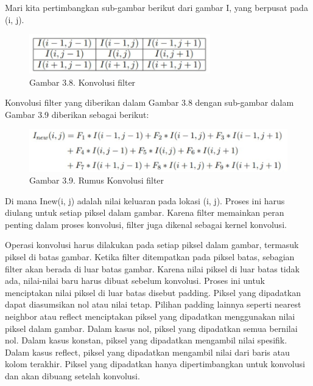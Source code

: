 \documentclass[
  letterpaper,
  DIV=11,
  numbers=noendperiod]{scrreprt}
\begin{document}
Mari kita pertimbangkan sub-gambar berikut dari gambar I, yang berpusat
pada (i, j).

\begin{figure}

{\centering \includegraphics[width=0.7\textwidth,height=\textheight]{Asset/image1117.png}

}

\caption{Gambar 3.8. Konvolusi filter}

\end{figure}

Konvolusi filter yang diberikan dalam Gambar 3.8 dengan sub-gambar dalam
Gambar 3.9 diberikan sebagai berikut:

\begin{figure}

{\centering \includegraphics{Asset/image1118.png}

}

\caption{Gambar 3.9. Rumus Konvolusi filter}

\end{figure}

Di mana Inew(i, j) adalah nilai keluaran pada lokasi (i, j). Proses ini
harus diulang untuk setiap piksel dalam gambar. Karena filter memainkan
peran penting dalam proses konvolusi, filter juga dikenal sebagai kernel
konvolusi.

Operasi konvolusi harus dilakukan pada setiap piksel dalam gambar,
termasuk piksel di batas gambar. Ketika filter ditempatkan pada piksel
batas, sebagian filter akan berada di luar batas gambar. Karena nilai
piksel di luar batas tidak ada, nilai-nilai baru harus dibuat sebelum
konvolusi. Proses ini untuk menciptakan nilai piksel di luar batas
disebut padding. Piksel yang dipadatkan dapat diasumsikan nol atau nilai
tetap. Pilihan padding lainnya seperti nearest neighbor atau reflect
menciptakan piksel yang dipadatkan menggunakan nilai piksel dalam
gambar. Dalam kasus nol, piksel yang dipadatkan semua bernilai nol.
Dalam kasus konstan, piksel yang dipadatkan mengambil nilai spesifik.
Dalam kasus reflect, piksel yang dipadatkan mengambil nilai dari baris
atau kolom terakhir. Piksel yang dipadatkan hanya dipertimbangkan untuk
konvolusi dan akan dibuang setelah konvolusi.
\end{document}
